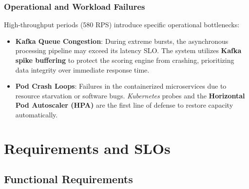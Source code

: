 \documentclass[12pt]{report}
\begin{document}
\subsection{Operational and Workload Failures}
High-throughput periods (580 RPS) introduce specific operational bottlenecks:
\begin{itemize}
    \item \textbf{Kafka Queue Congestion}: During extreme bursts, the asynchronous processing pipeline may exceed its latency SLO. The system utilizes \textbf{Kafka spike buffering} to protect the scoring engine from crashing, prioritizing data integrity over immediate response time.
    \item \textbf{Pod Crash Loops}: Failures in the containerized microservices due to resource starvation or software bugs. \textit{Kubernetes} probes and the \textbf{Horizontal Pod Autoscaler (HPA)} are the first line of defense to restore capacity automatically.
\end{itemize}

\chapter{Requirements and SLOs}

\section{Functional Requirements}
\end{document}
